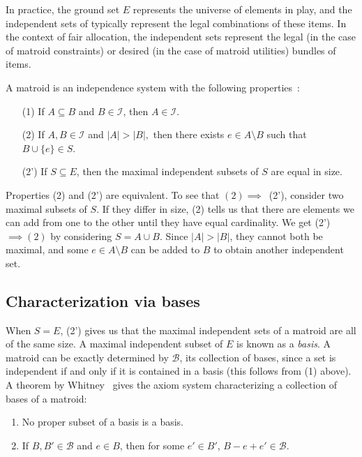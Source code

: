 In practice, the ground set $E$ represents the universe of elements in play, and the independent sets of typically represent the legal combinations of these items. In the context of fair allocation, the independent sets represent the legal (in the case of matroid constraints) or desired (in the case of matroid utilities) bundles of items.

A matroid is an independence system with the following properties~\cite{whitney-1935}:
\begin{enumerate}
  \item[(1)] If $A \subseteq B$ and $B \in \mathcal{I}$, then $A \in \mathcal{I}$.
  \item[(2)] If $A, B \in \mathcal{I}$ and $|A| > |B|,$ then there exists $e \in A \setminus B$ such that $B \cup \{e\} \in S$.
  \item[(2')] If $S \subseteq E$, then the maximal independent subsets of $S$ are equal in size.
\end{enumerate}
Properties (2) and (2') are equivalent. To see that $(2) \implies$~(2'), consider two maximal subsets of $S$. If they differ in size, (2) tells us that there are elements we can add from one to the other until they have equal cardinality. We get (2')~$\implies (2)$ by considering $S = A \cup B$. Since $|A|>|B|$, they cannot both be maximal, and some $e \in A \setminus B$ can be added to $B$ to obtain another independent set.

\subsection{Characterization via bases} When $S=E$, (2') gives us that the maximal independent sets of a matroid are all of the same size. A maximal independent subset of $E$ is known as a \textit{basis}. A matroid can be exactly determined by $\mathcal{B}$, its collection of bases, since a set is independent if and only if it is contained in a basis (this follows from (1) above). A theorem by Whitney~\cite{whitney-1935} gives the axiom system characterizing a collection of bases of a matroid: 
\begin{enumerate}
  \item No proper subset of a basis is a basis.
  \item If $B, B'\in \mathcal{B}$ and $e \in B$, then for some $e'\in B'$, $B-e+e'\in\mathcal{B}$.
\end{enumerate}

